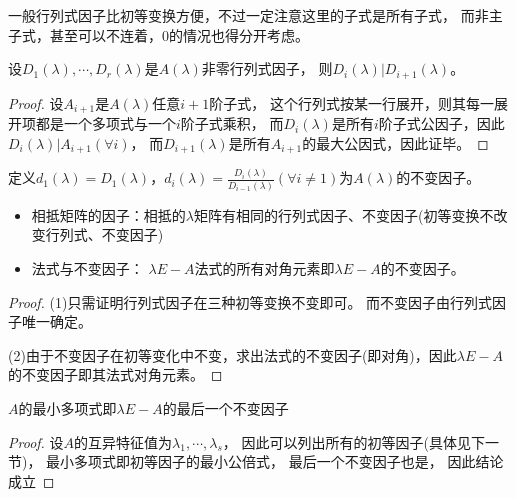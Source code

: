 \begin{note}
  一般行列式因子比初等变换方便，不过一定注意这里的子式是所有子式，
  而非主子式，甚至可以不连着，$0$的情况也得分开考虑。
\end{note}

\begin{lemma}[行列式因子的相除性]
  设$D_1(\lambda),\cdots,D_r(\lambda)$是$A(\lambda)$非零行列式因子，
  则$D_i(\lambda) | D_{i+1}(\lambda)$。
\end{lemma}

\begin{proof}
  设$A_{i+1}$是$A(\lambda)$任意$i+1$阶子式，
  这个行列式按某一行展开，则其每一展开项都是一个多项式与一个$i$阶子式乘积，
  而$D_i(\lambda)$是所有$i$阶子式公因子，因此$D_i(\lambda) | A_{i+1}(\forall i)$，
  而$D_{i+1}(\lambda)$是所有$A_{i+1}$的最大公因式，因此证毕。
\end{proof}

\begin{definition}[不变因子]
  定义$d_1(\lambda ) = D_1(\lambda)$，$d_i(\lambda) = \frac{D_i(\lambda)}{D_{i-1}(\lambda)}(\forall i \neq 1)$为$A(\lambda)$的不变因子。
\end{definition}

\begin{theorem}
  \begin{itemize}
  \item 相抵矩阵的因子：相抵的$\lambda$矩阵有相同的行列式因子、不变因子(初等变换不改变行列式、不变因子)
  \item 法式与不变因子：
    $\lambda E - A$法式的所有对角元素即$\lambda E - A$的不变因子。
  \end{itemize}
\end{theorem}

\begin{proof}
  (1)只需证明行列式因子在三种初等变换不变即可。
  而不变因子由行列式因子唯一确定。

  (2)由于不变因子在初等变化中不变，求出法式的不变因子(即对角)，因此$\lambda E - A$的不变因子即其法式对角元素。
\end{proof}

\begin{theorem}[不变因子与最小多项式]
  $A$的最小多项式即$\lambda E - A$的最后一个不变因子
\end{theorem}

\begin{proof}
  设$A$的互异特征值为$\lambda_1,\cdots,\lambda_s$，
  因此可以列出所有的初等因子(具体见下一节)，
  最小多项式即初等因子的最小公倍式，
  最后一个不变因子也是，
  因此结论成立
\end{proof}

